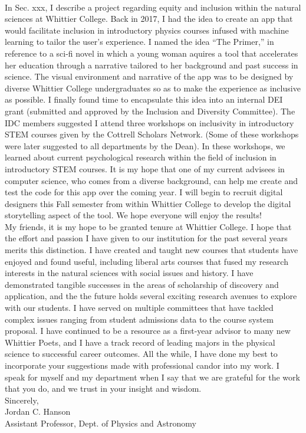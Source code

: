 \documentclass[../../main.tex]{subfiles}
\begin{document}
\\
\vspace{0.25cm}
In Sec. xxx, I describe a project regarding equity and inclusion within the natural sciences at Whittier College.  Back in 2017, I had the idea to create an app that would facilitate inclusion in introductory physics courses infused with machine learning to tailor the user's experience.  I named the idea ``The Primer,'' in reference to a sci-fi novel in which a young woman aquires a tool that accelerates her education through a narrative tailored to her background and past success in science.  The visual environment and narrative of the app was to be designed by diverse Whittier College undergraduates so as to make the experience as inclusive as possible.  I finally found time to encapsulate this idea into an internal DEI grant (submitted and approved by the Inclusion and Diversity Committee).  The IDC members suggested I attend three workshops on inclusivity in introductory STEM courses given by the Cottrell Scholars Network.  (Some of these workshops were later suggested to all departments by the Dean).  In these workshops, we learned about current psychological research within the field of inclusion in introductory STEM courses.  It is my hope that one of my current advisees in computer science, who comes from a diverse background, can help me create and test the code for this app over the coming year.  I will begin to recruit digital designers this Fall semester from within Whittier College to develop the digital storytelling aspect of the tool.  We hope everyone will enjoy the results!
\\
\vspace{0.25cm}
My friends, it is my hope to be granted tenure at Whittier College.  I hope that the effort and passion I have given to our institution for the past several years merits this distinction.  I have created and taught new courses that students have enjoyed and found useful, including liberal arts courses that fused my research interests in the natural sciences with social issues and history.  I have demonstrated tangible successes in the areas of scholarship of discovery and application, and the the future holds several exciting research avenues to explore with our students.  I have served on multiple committees that have tackled complex issues ranging from student admissions data to the course system proposal.  I have continued to be a resource as a first-year advisor to many new Whittier Poets, and I have a track record of leading majors in the physical science to successful career outcomes.  All the while, I have done my best to incorporate your suggestions made with professional candor into my work.  I speak for myself and my department when I say that we are grateful for the work that you do, and we trust in your insight and wisdom.
\\
\vspace{0.25cm}
Sincerely, \\
Jordan C. Hanson \\
Assistant Professor, Dept. of Physics and Astronomy
\end{document}
